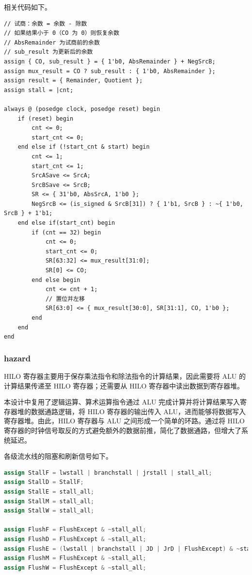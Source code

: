 相关代码如下。

\begin{lstlisting}
// 试商：余数 = 余数 - 除数
// 如果结果小于 0（CO 为 0）则恢复余数
// AbsRemainder 为试商前的余数
// sub_result 为更新后的余数
assign { CO, sub_result } = { 1'b0, AbsRemainder } + NegSrcB;
assign mux_result = CO ? sub_result : { 1'b0, AbsRemainder };
assign result = { Remainder, Quotient };
assign stall = |cnt;

always @ (posedge clock, posedge reset) begin
    if (reset) begin
        cnt <= 0;
        start_cnt <= 0;
    end else if (!start_cnt & start) begin
        cnt <= 1;
        start_cnt <= 1;
        SrcASave <= SrcA;
        SrcBSave <= SrcB;
        SR <= { 31'b0, AbsSrcA, 1'b0 };
        NegSrcB <= (is_signed & SrcB[31]) ? { 1'b1, SrcB } : ~{ 1'b0, SrcB } + 1'b1;
    end else if(start_cnt) begin
        if (cnt == 32) begin
            cnt <= 0;
            start_cnt <= 0;
            SR[63:32] <= mux_result[31:0];
            SR[0] <= CO;
        end else begin
            cnt <= cnt + 1;
            // 置位并左移
            SR[63:0] <= { mux_result[30:0], SR[31:1], CO, 1'b0 };
        end
    end
end
\end{lstlisting}

\subsubsection{hazard}

HILO 寄存器主要用于保存乘法指令和除法指令的计算结果，因此需要将 ALU 的计算结果传递至 HILO 寄存器；还需要从 HILO 寄存器中读出数据到寄存器堆。

本设计中复用了逻辑运算、算术运算指令通过 ALU 完成计算并将计算结果写入寄存器堆的数据通路逻辑，将 HILO 寄存器的输出传入 ALU，进而能够将数据写入寄存器堆。由此，HILO 寄存器与 ALU 之间形成一个简单的环路。通过将 HILO 寄存器的时钟信号取反的方式避免额外的数据前推，简化了数据通路，但增大了系统延迟。

各级流水线的阻塞和刷新信号如下。

\begin{lstlisting}[language=Verilog]
assign StallF = lwstall | branchstall | jrstall | stall_all;
assign StallD = StallF;
assign StallE = stall_all;
assign StallM = stall_all;
assign StallW = stall_all;

assign FlushF = FlushExcept & ~stall_all;
assign FlushD = FlushExcept & ~stall_all;
assign FlushE = (lwstall | branchstall | JD | JrD | FlushExcept) & ~stall_all;
assign FlushM = FlushExcept & ~stall_all;
assign FlushW = FlushExcept & ~stall_all;
\end{lstlisting}

